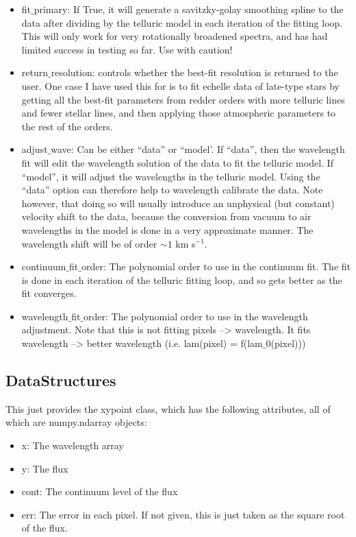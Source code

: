 \documentclass{article}
\begin{document}
\begin{itemize}
\begin{itemize}
      \item fit$\_$primary: If True, it will generate a savitzky-golay smoothing spline to the data after dividing by the telluric model in each iteration of the fitting loop. This will only work for very rotationally broadened spectra, and has had limited success in testing so far. Use with caution!

      \item return$\_$resolution: controls whether the best-fit resolution is returned to the user. One case I have used this for is to fit echelle data of late-type stars by getting all the best-fit parameters from redder orders with more telluric lines and fewer stellar lines, and then applying those atmospheric parameters to the rest of the orders.
      
      \item adjust$\_$wave: Can be either ``data'' or ``model'. If ``data'', then the wavelength fit will edit the wavelength solution of the data to fit the telluric model. If ``model'', it will adjust the wavelengths in the telluric model. Using the ``data'' option can therefore help to wavelength calibrate the data. Note however, that doing so will usually introduce an unphysical (but constant) velocity shift to the data, because the conversion from vacuum to air wavelengths in the model is done in a very approximate manner. The wavelength shift will be of order $\sim 1$ km s$^{-1}$.
      
      \item continuum$\_$fit$\_$order: The polynomial order to use in the continuum fit. The fit is done in each iteration of the telluric fitting loop, and so gets better as the fit converges.
      
      \item wavelength$\_$fit$\_$order: The polynomial order to use in the wavelength adjustment. Note that this is not fitting pixels --> wavelength. It fits wavelength --> better wavelength (i.e. lam(pixel) = f(lam$\_$0(pixel)))
    
    \end{itemize}
    
  
  
    
    
    
    
\subsection{DataStructures}
\label{subsec:datastructures}
This just provides the xypoint class, which has the following attributes, all of which are numpy.ndarray objects:
\begin{itemize}
  \item x: The wavelength array
  \item y: The flux
  \item cont: The continuum level of the flux
  \item err: The error in each pixel. If not given, this is just taken as the square root of the flux.
\end{itemize}


\end{itemize}
\end{document}
